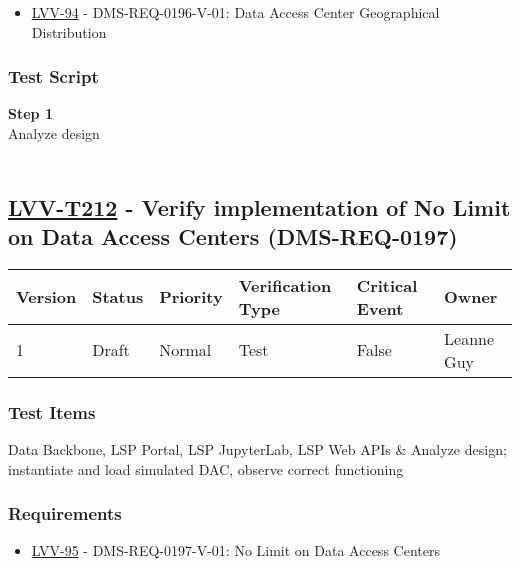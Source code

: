 \begin{itemize}
\tightlist
\item
  \href{https://jira.lsstcorp.org/browse/LVV-94}{LVV-94} -
  DMS-REQ-0196-V-01: Data Access Center Geographical Distribution
\end{itemize}

\hypertarget{test-script-111}{%
\subsubsection{Test Script}\label{test-script-111}}

\textbf{Step 1}\\
Analyze design\\
~\\

\hypertarget{lvv-t212---verify-implementation-of-no-limit-on-data-access-centers-dms-req-0197}{%
\subsection{\texorpdfstring{\href{https://jira.lsstcorp.org/secure/Tests.jspa\#/testCase/LVV-T212}{LVV-T212}
- Verify implementation of No Limit on Data Access Centers
(DMS-REQ-0197)}{LVV-T212 - Verify implementation of No Limit on Data Access Centers (DMS-REQ-0197)}}\label{lvv-t212---verify-implementation-of-no-limit-on-data-access-centers-dms-req-0197}}

\begin{longtable}[]{@{}llllll@{}}
\toprule
Version & Status & Priority & Verification Type & Critical Event &
Owner\tabularnewline
\midrule
\endhead
1 & Draft & Normal & Test & False & Leanne Guy\tabularnewline
\bottomrule
\end{longtable}

\hypertarget{test-items-112}{%
\subsubsection{Test Items}\label{test-items-112}}

Data Backbone, LSP Portal, LSP JupyterLab, LSP Web APIs \& Analyze
design; instantiate and load simulated DAC, observe correct functioning

\hypertarget{requirements-112}{%
\subsubsection{Requirements}\label{requirements-112}}

\begin{itemize}
\tightlist
\item
  \href{https://jira.lsstcorp.org/browse/LVV-95}{LVV-95} -
  DMS-REQ-0197-V-01: No Limit on Data Access Centers
\end{itemize}

